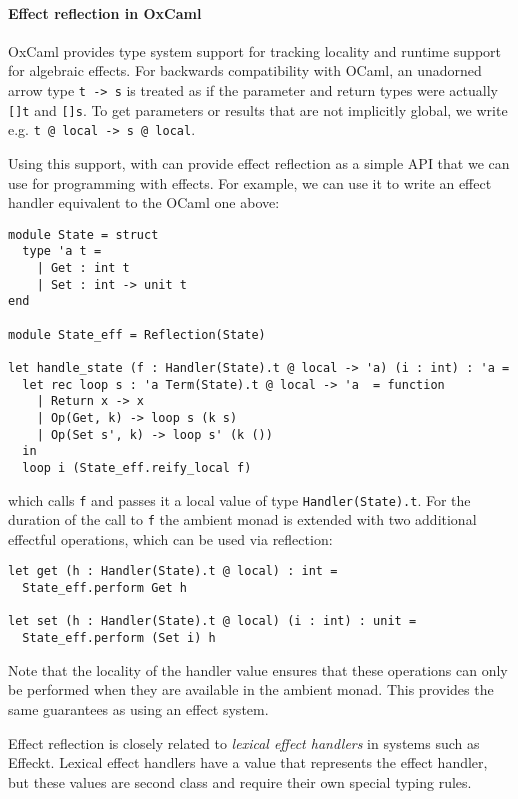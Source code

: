 \documentclass[acmsmall, screen, nonacm]{acmart}
\theoremstyle{definition}
\begin{document}
\paragraph{Effect reflection in OxCaml}
OxCaml\cite{lorenzen2024oxidizing} provides type system support for
tracking locality and runtime support for algebraic effects. For
backwards compatibility with OCaml, an unadorned arrow type
\lstinline[style=ocaml]{t -> s} is treated as if the parameter and
return types were actually \lstinline[style=ocaml]{[]t} and
\lstinline[style=ocaml]{[]s}. To get parameters or results that are not
implicitly global, we write
e.g. \lstinline[style=ocaml]{t @ local -> s @ local}.

Using this support, with can provide effect reflection as a simple API
that we can use for programming with effects.  For example, we can use
it to write an effect handler equivalent to the OCaml one above:
\begin{lstlisting}[style=ocaml]
module State = struct
  type 'a t =
    | Get : int t
    | Set : int -> unit t
end

module State_eff = Reflection(State)

let handle_state (f : Handler(State).t @ local -> 'a) (i : int) : 'a =
  let rec loop s : 'a Term(State).t @ local -> 'a  = function
    | Return x -> x
    | Op(Get, k) -> loop s (k s)
    | Op(Set s', k) -> loop s' (k ())
  in
  loop i (State_eff.reify_local f)
\end{lstlisting}
which calls \lstinline[style=ocaml]{f} and passes it a local value of
type \lstinline[style=ocaml]{Handler(State).t}. For the duration of the
call to \lstinline[style=ocaml]{f} the ambient monad is extended with
two additional effectful operations, which can be used via reflection:
\begin{lstlisting}[style=ocaml]
let get (h : Handler(State).t @ local) : int =
  State_eff.perform Get h

let set (h : Handler(State).t @ local) (i : int) : unit =
  State_eff.perform (Set i) h
\end{lstlisting}

Note that the locality of the handler value ensures that these
operations can only be performed when they are available in the ambient
monad. This provides the same guarantees as using an effect system.

Effect reflection is closely related to \emph{lexical effect handlers} in
systems such as Effeckt\cite{??}. Lexical effect handlers have a value that
represents the effect handler, but these values are second class and
require their own special typing rules.
\end{document}
